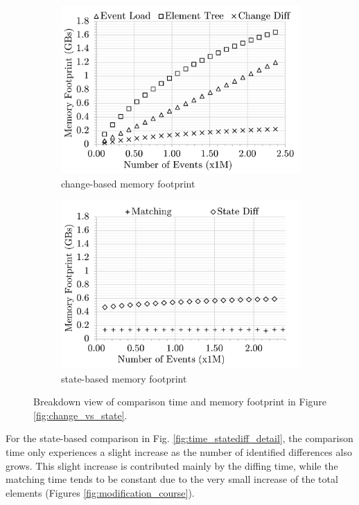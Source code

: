 \begin{figure}[ht]
\begin{subfigure}[t]{0.245\linewidth}
        \includegraphics[width=\linewidth]{mixed-memory-events-detail}
        \caption{change-based memory footprint}
        \label{fig:memory_changediff_detail}
    \end{subfigure}
    \hfill
    \begin{subfigure}[t]{0.245\linewidth}
        \includegraphics[width=\linewidth]{state-memory-events-detail}
        \caption{state-based memory footprint}
        \label{fig:memory_statediff_detail}
    \end{subfigure}
    \caption{Breakdown view of comparison time and memory footprint in Figure \ref{fig:change_vs_state}.}
    \label{fig:time_memory_detail}
\end{figure}

For the state-based comparison in Fig. \ref{fig:time_statediff_detail}, the comparison time only experiences a slight increase as the number of identified differences also grows.
This slight increase is contributed mainly by the diffing time, while the matching time tends to be constant due to the very small increase of the total elements (Figures \ref{fig:modification_course}).

